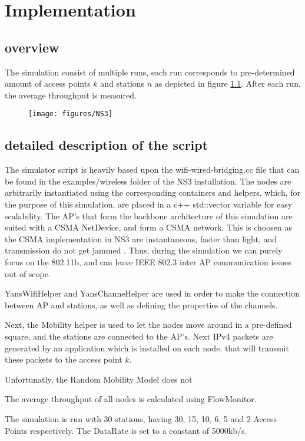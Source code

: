 \chapter{Implementation}

\section{overview} 
The simulation consist of multiple runs, each run corresponds to pre-determined amount of access points $k$ and stations $n$ as depicted in figure \ref{fig:NS3}. After each run, the average throughput is measured. 
 

\begin{figure}[h]
\centering
\texttt{[image: figures/NS3]}
\caption[Simulation setup]{}
\label{fig:NS3}
\end{figure}

\section{detailed description of the script} 
The simulator script is heavily based upon the wifi-wired-bridging.cc file that can be found in the examples/wireless folder of the NS3 installation. The nodes are arbitrarily instantiated using the corresponding containers and helpers, which, for the purpose of this simulation, are placed in a c++ std::vector variable for easy scalability. The AP's that form the backbone architecture of this simulation are suited with a CSMA NetDevice, and form a CSMA network. This is choosen as the CSMA implementation in NS3 are instantaneous, faster than light, and transmission do not get jammed \cite{CSMADevices}. Thus, during the simulation we can purely focus on the 802.11b, and can leave IEEE 802.3 inter AP communication issues out of scope. 

YansWifiHelper and YansChanneHelper are used in order to make the connection between AP and stations, as well as defining the properties of the channels.

Next, the Mobility helper is used to let the nodes move around in a pre-defined square, and the stations are connected to the AP's. Next IPv4 packets are generated by an application which is installed on each node, that will transmit these packets to the access point $k$. 

Unfortunatly, the Random Mobility Model does not 

The average throughput of all nodes is calculated using FlowMonitor.  

The simulation is run with 30 stations, having 30, 15, 10, 6, 5 and 2 Access Points respectively. The DataRate is set to a constant of 5000kb/s.    
